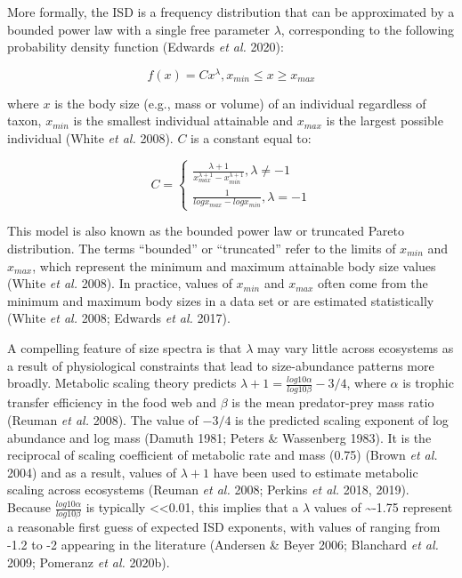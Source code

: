 \documentclass[
  12pt,
]{article}
\begin{document}
More formally, the ISD is a frequency distribution that can be
approximated by a bounded power law with a single free parameter
\(\lambda\), corresponding to the following probability density function
(Edwards \emph{et al.} 2020):

\begin{equation}
f(x) = Cx^\lambda, x_{min} \le x \ge x_{max}
\end{equation}

where \(x\) is the body size (e.g., mass or volume) of an individual
regardless of taxon, \(x_{min}\) is the smallest individual attainable
and \(x_{max}\) is the largest possible individual (White \emph{et al.}
2008). \(C\) is a constant equal to:

\begin{equation}
 C = \begin{cases}\frac{\lambda + 1}{{x_{max}^{\lambda+1}} - {x_{min}^{\lambda+1}}}, \lambda \neq-1 \\
\frac{1}{{logx_{max}} - {logx_{min}}}, \lambda = -1\end{cases}
\end{equation}

This model is also known as the bounded power law or truncated Pareto
distribution. The terms ``bounded'' or ``truncated'' refer to the limits
of \(x_{min}\) and \(x_{max}\), which represent the minimum and maximum
attainable body size values (White \emph{et al.} 2008). In practice,
values of \(x_{min}\) and \(x_{max}\) often come from the minimum and
maximum body sizes in a data set or are estimated statistically (White
\emph{et al.} 2008; Edwards \emph{et al.} 2017).

A compelling feature of size spectra is that \(\lambda\) may vary little
across ecosystems as a result of physiological constraints that lead to
size-abundance patterns more broadly. Metabolic scaling theory predicts
\(\lambda + 1 = \frac{log10\alpha}{log10\beta} - 3/4\), where \(\alpha\)
is trophic transfer efficiency in the food web and \(\beta\) is the mean
predator-prey mass ratio (Reuman \emph{et al.} 2008). The value of
\(-3/4\) is the predicted scaling exponent of log abundance and log mass
(Damuth 1981; Peters \& Wassenberg 1983). It is the reciprocal of
scaling coefficient of metabolic rate and mass (0.75) (Brown \emph{et
al.} 2004) and as a result, values of \(\lambda + 1\) have been used to
estimate metabolic scaling across ecosystems (Reuman \emph{et al.} 2008;
Perkins \emph{et al.} 2018, 2019). Because
\(\frac{log10\alpha}{log10\beta}\) is typically \textless\textless0.01,
this implies that a \(\lambda\) values of \textasciitilde-1.75 represent
a reasonable first guess of expected ISD exponents, with values of
ranging from -1.2 to -2 appearing in the literature (Andersen \& Beyer
2006; Blanchard \emph{et al.} 2009; Pomeranz \emph{et al.} 2020b).
\end{document}
